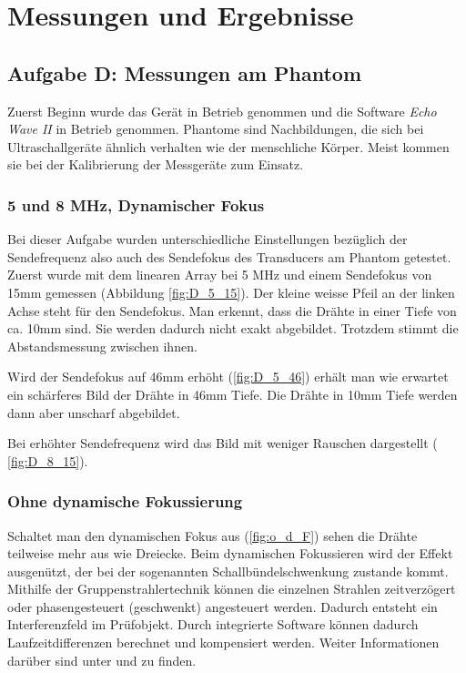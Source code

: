 \documentclass[11pt]{scrartcl}
\begin{document}
    \section{Messungen und Ergebnisse}

    \subsection{Aufgabe D: Messungen am Phantom}
    Zuerst Beginn wurde das Gerät in Betrieb genommen und die Software \emph{Echo Wave II} in Betrieb genommen.
    Phantome sind Nachbildungen, die sich bei Ultraschallgeräte ähnlich verhalten wie der menschliche Körper.
    Meist kommen sie bei der Kalibrierung der Messgeräte zum Einsatz.

    \subsubsection{5 und 8 MHz, Dynamischer Fokus}

    Bei dieser Aufgabe wurden unterschiedliche Einstellungen bezüglich der Sendefrequenz also auch des Sendefokus des Transducers am Phantom getestet.
    Zuerst wurde mit dem linearen Array bei 5 MHz und einem Sendefokus von 15mm gemessen (Abbildung \ref{fig:D_5_15}).
    Der kleine weisse Pfeil an der linken Achse steht für den Sendefokus.
    Man erkennt, dass die Drähte in einer Tiefe von ca. 10mm sind.
    Sie werden dadurch nicht exakt abgebildet.
    Trotzdem stimmt die Abstandsmessung zwischen ihnen.

    Wird der Sendefokus auf 46mm erhöht (\autoref{fig:D_5_46}) erhält man wie erwartet ein schärferes Bild der
    Drähte in 46mm Tiefe.
    Die Drähte in 10mm Tiefe werden dann aber unscharf abgebildet.

    Bei erhöhter Sendefrequenz wird das Bild mit weniger Rauschen dargestellt ( \autoref{fig:D_8_15}).

    \subsubsection{Ohne dynamische Fokussierung}

    Schaltet man den dynamischen Fokus aus (\autoref{fig:o_d_F}) sehen die Drähte teilweise mehr aus wie
    Dreiecke.
    Beim dynamischen Fokussieren wird der Effekt ausgenützt, der bei der sogenannten Schallbündelschwenkung zustande
    kommt.
    Mithilfe der Gruppenstrahlertechnik können die einzelnen Strahlen zeitverzögert oder phasengesteuert (geschwenkt)
    angesteuert werden.
    Dadurch entsteht ein Interferenzfeld im Prüfobjekt.
    Durch integrierte Software können dadurch Laufzeitdifferenzen berechnet und kompensiert werden.
    Weiter Informationen darüber sind unter \cite{gruppenstrahler} und \cite{arraytechnik} zu finden.
\end{document}
